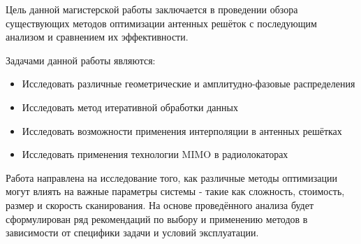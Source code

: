 Цель данной магистерской работы заключается в проведении обзора существующих методов оптимизации антенных решёток с последующим анализом и сравнением их эффективности.

Задачами данной работы являются:

\begin{itemize}
      \item Исследовать различные геометрические и амплитудно-фазовые распределения
      \item Исследовать метод итеративной обработки данных
      \item Исследовать возможности применения интерполяции в антенных решётках
      \item Исследовать применения технологии MIMO в радиолокаторах
\end{itemize}

Работа направлена на исследование того, как различные методы оптимизации могут влиять на важные параметры системы - такие как сложность, стоимость,
размер и скорость сканирования. На основе проведённого анализа будет сформулирован ряд рекомендаций по выбору и
применению методов в зависимости от специфики задачи и условий эксплуатации.